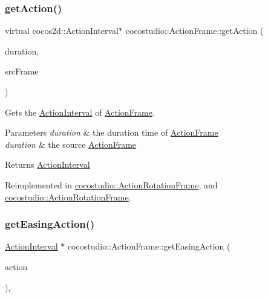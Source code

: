 \subsubsection{\texorpdfstring{get\+Action()}{getAction()}\hspace{0.1cm}{\footnotesize\ttfamily [4/4]}}
{\footnotesize\ttfamily virtual cocos2d\+::\+Action\+Interval$\ast$ cocostudio\+::\+Action\+Frame\+::get\+Action (\begin{DoxyParamCaption}\item[{float}]{duration,  }\item[{\hyperlink{classcocostudio_1_1ActionFrame}{Action\+Frame} $\ast$}]{src\+Frame }\end{DoxyParamCaption})\hspace{0.3cm}{\ttfamily [virtual]}}

Gets the \hyperlink{classActionInterval}{Action\+Interval} of \hyperlink{classcocostudio_1_1ActionFrame}{Action\+Frame}.


\begin{DoxyParams}{Parameters}
{\em duration} & the duration time of \hyperlink{classcocostudio_1_1ActionFrame}{Action\+Frame}\\
\hline
{\em duration} & the source \hyperlink{classcocostudio_1_1ActionFrame}{Action\+Frame}\\
\hline
\end{DoxyParams}
\begin{DoxyReturn}{Returns}
\hyperlink{classActionInterval}{Action\+Interval} 
\end{DoxyReturn}


Reimplemented in \hyperlink{classcocostudio_1_1ActionRotationFrame_ab713e9ea4332bb5cea201b7f6dc424fc}{cocostudio\+::\+Action\+Rotation\+Frame}, and \hyperlink{classcocostudio_1_1ActionRotationFrame_adb56d8ed3cc97f590cba9429602ef918}{cocostudio\+::\+Action\+Rotation\+Frame}.

\mbox{\label{classcocostudio_1_1ActionFrame_a73e7244a9bebca9977830d861194e41c}} 
\subsubsection{\texorpdfstring{get\+Easing\+Action()}{getEasingAction()}\hspace{0.1cm}{\footnotesize\ttfamily [1/2]}}
{\footnotesize\ttfamily \hyperlink{classActionInterval}{Action\+Interval} $\ast$ cocostudio\+::\+Action\+Frame\+::get\+Easing\+Action (\begin{DoxyParamCaption}\item[{cocos2d\+::\+Action\+Interval $\ast$}]{action }\end{DoxyParamCaption})\hspace{0.3cm}{\ttfamily [protected]}, {\ttfamily [virtual]}}

